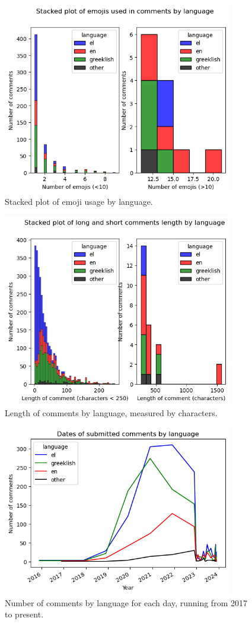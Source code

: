\documentclass[11pt, a4paper]{article}
\begin{document}
	\begin{figure}
		\includegraphics[width=10cm]{emojis_dis.png}
		\centering
		\caption{Stacked plot of emoji usage by language.}
		\label{fig::emojis_dist}
	\end{figure}
	
	\begin{figure}
		\includegraphics[width=10cm]{length_dis.png}
		\centering
		\caption{Length of comments by language, measured by characters.}
		\label{fig:length_dis}
	\end{figure}
	
	\begin{figure}
		\includegraphics[width=10cm]{time_plot.png}
		\centering
		\caption{Number of comments by language for each day, running from 2017 to present.}
		\label{fig::timeseries.png}
	\end{figure}
	
\end{document}
